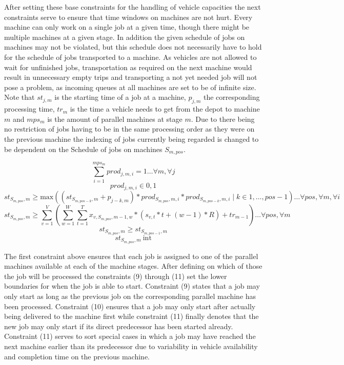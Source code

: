 After setting these base constraints for the handling of vehicle capacities the next constraints serve to ensure that time windows on machines are not hurt.
Every machine can only work on a single job at a given time, though there might be multiple machines at a given stage. In addition the given schedule of
jobs on machines may not be violated, but this schedule does not necessarily have to hold for the schedule of jobs transported to a machine. As vehicles
are not allowed to wait for unfinished jobs, transportation as required on the next machine would result in unnecessary
empty trips and transporting a not yet needed job will not pose a problem, as incoming queues at all machines are set to be of infinite size. Note that
\(st_{j,m}\) is the starting time of a job at a machine, \(p_{j,m}\) the corresponding processing time, \(tr_{m}\) is the time a vehicle needs to get from
the depot to machine \(m\) and \(mps_{m}\) is the amount of parallel machines at stage \(m\). Due to there being no restriction of jobs having to be in the
same processing order as they were on the previous machine the indexing of jobs currently being regarded is changed to be dependent on the Schedule of jobs
on machines \(S_{m,pos}\).

\begin{equation}
  \sum_{i = 1}^{mps_{m}}prod_{j,m,i} = 1 \ldots \forall m, \forall j
\end{equation}
\begin{equation}
  prod_{j,m,i} \in {0,1}
\end{equation}
\begin{equation}
 st_{S_{m,pos},m} \geq \mathrm{max}((st_{S_{m,pos-k}, m} + p_{j-k,m}) * prod_{S_{m,pos},m,i} * prod_{S_{m,pos-k},m,i}\mid k \in {1,\ldots,pos-1}) \ldots \forall pos, \forall m, \forall i
\end{equation}
\begin{equation}
 st_{S_{m,pos},m} \geq \sum_{v=1}^{V}(\sum_{w=1}^{W}\sum_{t=1}^{T} x_{v,S_{m,pos},m-1,w} * (s_{v,t} * t + (w-1) * R) + tr_{m-1}) \ldots \forall pos, \forall m
\end{equation}
\begin{equation}
  st_{S_{m,pos},m} \geq st_{S_{m,pos-1},m}
\end{equation}
\begin{equation}
  st_{S_{m,pos},m}\> \mathrm{int}
\end{equation}

The first constraint above ensures that each job is assigned to one of the parallel machines available at each of the machine stages. After defining
on which of those the job will be processed the constraints (9) through (11) set the lower boundaries for when the job is able to start. Constraint
(9) states that a job may only start as long as the previous job on the corresponding parallel machine has been processed. Constraint (10) ensures
that a job may only start after actually being delivered to the machine first while constraint (11) finally denotes that the new job may only start
if its direct predecessor has been started already. Constraint (11) serves to sort special cases in which a job may have reached the next machine
earlier than its predecessor due to variability in vehicle availability and completion time on the previous machine.

